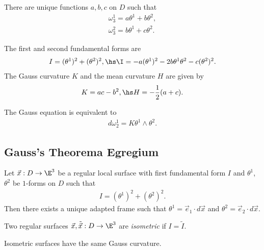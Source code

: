\documentclass{article}
\begin{document}
\begin{lemma}
    There are unique functions $a,b,c$ on $D$ such that 
    \begin{align*}
        \omega_3^1 = a\theta^1+b\theta^2,\\
        \omega_3^2 = b\theta^1+c\theta^2.
    \end{align*}
\end{lemma}

\begin{proposition}
    The first and second fundamental forms are 
    \begin{align*}
        I = (\theta^1)^2 + (\theta^2)^2,\hs 
        \I = -a(\theta^1)^2-2b\theta^1\theta^2-c(\theta^2)^2.
    \end{align*}
    The Gauss curvature $K$ and the mean curvature $H$ are given by 
    \begin{align*}
        K=ac-b^2, \hs H=-\frac{1}{2}(a+c).
    \end{align*}
\end{proposition}

\begin{proposition}
    The Gauss equation is equivalent to 
    \begin{align*}
        d\omega_2^1 = K\theta^1\wedge\theta^2.
    \end{align*}
\end{proposition}

\subsection{Gauss's Theorema Egregium}

\begin{proposition}
    Let $\vec x:D\to\E^3$ be a regular local surface with first fundamental form 
    $I$ and $\theta^1$, $\theta^2$ be $1$-forms on $D$ such that 
    \begin{align*}
        I = (\theta^1)^2+(\theta^2)^2.
    \end{align*}
    Then there exists a unique adapted frame such that $\theta^1=\vec e_1\cdot d\vec x$
    and $\theta^2 = \vec e_2 \cdot d\vec x$.
\end{proposition}

\begin{definition}
    Two regular surfaces $\vec x,\tilde{\vec x}:D\to\E^3$ are \emph{isometric}
    if $I=\tilde I$.
\end{definition}

\begin{theorem}
    Isometric surfaces have the same Gauss curvature.
\end{theorem}
\end{document}
